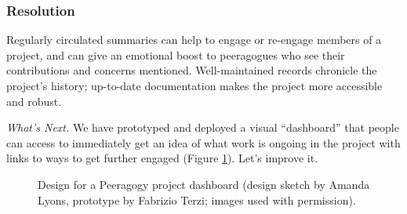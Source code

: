 \subsubsection*{Resolution} 
Regularly circulated summaries can help to engage or re-engage members of a project, and can give an emotional boost to peeragogues who see their contributions and concerns mentioned.  Well-maintained records chronicle the project's history; up-to-date documentation makes the project more accessible and robust.

\begin{framed}
\emph{What's Next.}
We have prototyped and deployed a visual ``dashboard'' that people can access to immediately get an idea of what work is ongoing in the project with links to ways to get further engaged (Figure \ref{dashboard}).  Let's improve it.
\end{framed}    


\begin{figure}
\caption{Design for a Peeragogy project dashboard (design sketch by Amanda Lyons, prototype by Fabrizio Terzi; images used with permission).\label{dashboard}}
\end{figure}

